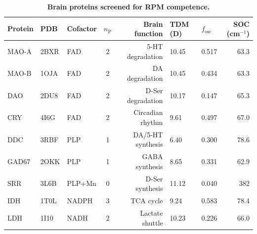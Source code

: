 \documentclass[11pt]{article}
\begin{document}
\begin{table}[p]
\centering
\caption{\textbf{Brain proteins screened for RPM competence.}}
\label{tab:proteins}
\small
\begin{tabular}{@{}lllcrllr@{}}
\toprule
Protein & PDB & Cofactor & $n_\mathrm{P}$ & Brain function & TDM (D) & $f_\mathrm{osc}$ & SOC (cm$^{-1}$) \\
\midrule
MAO-A  & 2BXR & FAD    & 2 & 5-HT degradation  & 10.45 & 0.517 & 63.3 \\
MAO-B  & 1OJA & FAD    & 2 & DA degradation     & 10.45 & 0.434 & 63.3 \\
DAO    & 2DU8 & FAD    & 2 & D-Ser degradation  & 10.17 & 0.147 & 65.3 \\
CRY    & 4I6G & FAD    & 2 & Circadian rhythm   & 9.61  & 0.497 & 67.0 \\
DDC    & 3RBF & PLP    & 1 & DA/5-HT synthesis  & 6.40  & 0.300 & 78.6 \\
GAD67  & 2OKK & PLP    & 1 & GABA synthesis     & 8.65  & 0.331 & 62.9 \\
SRR    & 3L6B & PLP+Mn & 0 & D-Ser synthesis    & 11.12 & 0.040 & 382  \\
IDH    & 1T0L & NADPH  & 3 & TCA cycle          & 9.24  & 0.583 & 78.4 \\
LDH    & 1I10 & NADH   & 2 & Lactate shuttle    & 10.23 & 0.226 & 66.0 \\
\bottomrule
\end{tabular}
\end{table}
\end{document}

